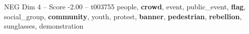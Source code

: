 \begin{textsample}{NEG Dim 4 – Score -2.00 – t003755}  \label{ex:f4_neg_021}
people, \textbf{crowd}, event, public\_event, \textbf{flag}, social\_group, \textbf{community}, youth, protest, \textbf{banner}, \textbf{pedestrian}, \textbf{rebellion}, sunglasses, demonstration

\end{textsample}
